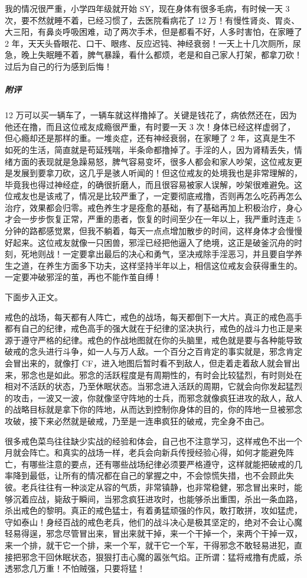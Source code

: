 \begin{case}
    我的情况很严重，小学四年级就开始 SY，现在身体有很多毛病，有时候一天 3 次，要不然就睡不着，已经习惯了，去医院看病花了 12 万！有慢性肾炎、胃炎、大三阳，有鼻炎呼吸困难，动了两次手术，但是都看不好，人多时害怕，在家睡了 2 年，天天头昏眼花、口干、眼疼、反应迟钝、神经衰弱！一天上十几次厕所，尿急，晚上失眠睡不着，脾气暴躁，看什么都烦，老是和自己家人打架，都拿刀砍！过后为自己的行为感到后悔！
    \subparagraph{附评} 12 万可以买一辆车了，一辆车就这样撸掉了。关键是钱花了，病依然还在，因为他还在撸，而且这位戒友成瘾很严重，有时要一天 3 次！身体已经这样虚弱了，但心瘾却还是那样的重。一堆炎症，还有神经衰弱，在家睡了 2 年，这真是生不如死的生活，简直就是苟延残喘，半条命都撸掉了。手淫的人，因为肾精丢失，情绪方面的表现就是急躁易怒，脾气容易变坏，很多人都会和家人吵架，这位戒友更是发展到要拿刀砍，这几乎是骇人听闻的！但这位戒友的处境我也是非常理解的，毕竟我也得过神经症，的确很折磨人，而且很容易被家人误解，吵架很难避免。这位戒友也是该戒了，情况是比较严重了，一定要彻底戒撸，否则再怎么吃药再怎么治疗，效果都会归零。戒色养生才是痊愈的基础，有了基础再加上积极治疗，身心才会一步步恢复正常，严重的患者，恢复的时间至少在一年以上，我严重时连走 5 分钟的路都感觉累，但我不躺着，每天一点点增加散步的时间，这样身体才会慢慢好起来。这位戒友就像一只困兽，邪淫已经把他逼入了绝境，这正是破釜沉舟的时刻，死地则战！一定要拿出最后的决心和勇气，坚决戒除手淫恶习，并且要自学养生之道，在养生方面多下功夫，这样坚持半年以上，相信这位戒友会获得重生的。一定要冲破邪淫的茧，再也不能作茧自缚！
\end{case}

下面步入正文。

戒色的战场，每天都有人阵亡，戒色的战场，每天都倒下一大片。真正的戒色高手都有自己的纪律，戒色高手的强大就在于纪律的坚决执行，戒色的战斗力也正是来源于遵守严格的纪律。戒色的作战地图就在你的头脑里，戒色就是要与各种能导致破戒的念头进行斗争，如一人与万人敌。一个百分之百肯定的事实就是，邪念肯定会冒出来的，就像打 CF，进入地图后暂时看不到敌人，但走着走着敌人就会冒出来，邪念也是如此。邪念的活跃程度是有周期性的，有时会比较猛烈，有时则处在相对不活跃的状态，乃至休眠状态。当邪念进入活跃的周期，它就会向你发起猛烈的攻击，一波又一波，你就像坚守阵地的士兵，而邪念就像疯狂进攻的敌人，敌人的战略目标就是拿下你的阵地，从而达到控制你身体的目的，你的阵地一旦被邪念攻破，接下来必然就是破戒，乃至是一连串疯狂的破戒，完全身不由己。

很多戒色菜鸟往往缺少实战的经验和体会，自己也不注意学习，这样戒色不出一个月就会阵亡。和真实的战场一样，老兵会向新兵传授经验心得，如何才能避免阵亡，有哪些注意的要点，还有哪些战场纪律必须要严格遵守，这样就能把破戒的几率降到最低，让所有的情况都在自己的掌握之中，不会惊慌失措，也不会顾此失彼。老兵往往有一种淡定从容的气质，非常镇静，也非常稳健，邪念冒出来时，能够沉着应战，毙敌于瞬间，当邪念疯狂进攻时，也能够杀出重围，杀出一条血路，杀出戒色的黎明。真正的戒色猛士，有着勇猛顽强的作风，敢打敢拼，攻如猛虎，守如泰山！身经百战的戒色老兵，他们的战斗决心是极其坚定的，绝对不会让心魔轻易得逞，邪念尽管冒出来，冒出来就干掉，来一个干掉一个，来两个干掉一双，来一个排，就干它一个排，来一个军，就干它一个军，干得邪念不敢轻易进犯，直接把邪念干回休眠状态，狠狠打击心魔的嚣张气焰。正所谓：猛将戒撸有虎威，杀透邪念几万重！不怕贼强，只要将猛！

